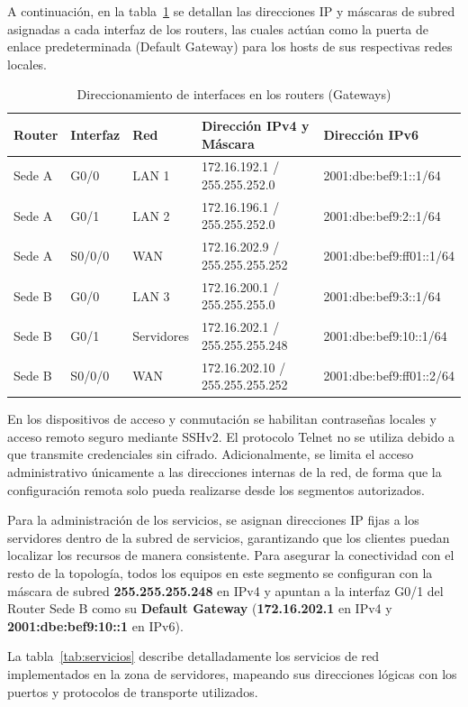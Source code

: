 A continuación, en la tabla~\ref{tab:routers} se detallan las direcciones IP y máscaras de subred asignadas a cada interfaz de los routers, las cuales actúan como la puerta de enlace predeterminada (Default Gateway) para los hosts de sus respectivas redes locales.

\begin{table}[H]
\centering
\caption{Direccionamiento de interfaces en los routers (Gateways)}
\label{tab:routers}
\begin{tabularx}{\textwidth}{l l l l l}
\toprule
Router & Interfaz & Red & Dirección IPv4 y Máscara & Dirección IPv6 \\
\midrule
Sede A & G0/0 & LAN 1 & 172.16.192.1 / 255.255.252.0 & 2001:dbe:bef9:1::1/64 \\
Sede A & G0/1 & LAN 2 & 172.16.196.1 / 255.255.252.0 & 2001:dbe:bef9:2::1/64 \\
Sede A & S0/0/0 & WAN & 172.16.202.9 / 255.255.255.252 & 2001:dbe:bef9:ff01::1/64 \\
\midrule
Sede B & G0/0 & LAN 3 & 172.16.200.1 / 255.255.255.0 & 2001:dbe:bef9:3::1/64 \\
Sede B & G0/1 & Servidores & 172.16.202.1 / 255.255.255.248 & 2001:dbe:bef9:10::1/64 \\
Sede B & S0/0/0 & WAN & 172.16.202.10 / 255.255.255.252 & 2001:dbe:bef9:ff01::2/64 \\
\bottomrule
\end{tabularx}
\end{table}

En los dispositivos de acceso y conmutación se habilitan contraseñas locales y
acceso remoto seguro mediante SSHv2. El protocolo Telnet no se utiliza debido
a que transmite credenciales sin cifrado. Adicionalmente, se limita el acceso
administrativo únicamente a las direcciones internas de la red, de forma que
la configuración remota solo pueda realizarse desde los segmentos autorizados.

Para la administración de los servicios, se asignan direcciones IP fijas a los servidores dentro de la subred de servicios, garantizando que los clientes puedan localizar los recursos de manera consistente. Para asegurar la conectividad con el resto de la topología, todos los equipos en este segmento se configuran con la máscara de subred \textbf{255.255.255.248} en IPv4 y apuntan a la interfaz G0/1 del Router Sede B como su \textbf{Default Gateway} (\textbf{172.16.202.1} en IPv4 y \textbf{2001:dbe:bef9:10::1} en IPv6). 

La tabla~\ref{tab:servicios} describe detalladamente los servicios de red implementados en la zona de servidores, mapeando sus direcciones lógicas con los puertos y protocolos de transporte utilizados.

